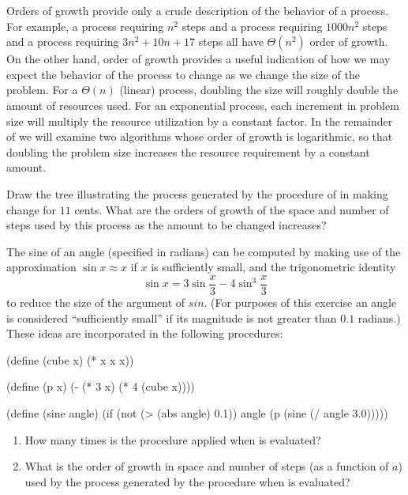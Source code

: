 Orders of growth provide only a crude description of the behavior of a process.
For example, a process requiring \( n^2 \) steps and a process requiring \( 1000 n^2 \) steps and a process requiring \( 3 n^2 + 10 n + 17 \) steps all have \( Θ(n^2) \) order of growth.
On the other hand, order of growth provides a useful indication of how we may expect the behavior of the process to change as we change the size of the problem.
For a \( Θ(n) \) (linear) process, doubling the size will roughly double the amount of resources used.
For an exponential process, each increment in problem size will multiply the resource utilization by a constant factor.
In the remainder of  we will examine two algorithms whose order of growth is logarithmic, so that doubling the problem size increases the resource requirement by a constant amount.



\begin{exercise}
	\label{Exercise 1.14}
	Draw the tree illustrating the process generated by the  procedure of  in making change for \( 11 \) cents.
	What are the orders of growth of the space and number of steps used by this process as the amount to be changed increases?
\end{exercise}



\begin{exercise}
	\label{Exercise 1.15}
	The sine of an angle (specified in radians) can be computed by making use of the approximation \( \sin x \approx x \) if \( x \) is sufficiently small, and the trigonometric identity
	\[
		\sin x = 3 \sin \frac{x}{3} - 4 \sin^3 \frac{x}{3}
	\]
	to reduce the size of the argument of \( sin \).
	(For purposes of this exercise an angle is considered “sufficiently small” if its magnitude is not greater than \( 0.1 \) radians.)
	These ideas are incorporated in the following procedures:
	\begin{scheme}
	  (define (cube x) (* x x x))

	  (define (p x) (- (* 3 x) (* 4 (cube x))))

	  (define (sine angle)
	    (if (not (> (abs angle) 0.1))
	        angle
	        (p (sine (/ angle 3.0)))))
	\end{scheme}
	\begin{enumerate}[label = \alph*., leftmargin = *]

		\item
			How many times is the procedure  applied when  is evaluated?

		\item
			What is the order of growth in space and number of steps (as a function of \( a \)) used by the process generated by the  procedure when  is evaluated?

	\end{enumerate}
\end{exercise}



